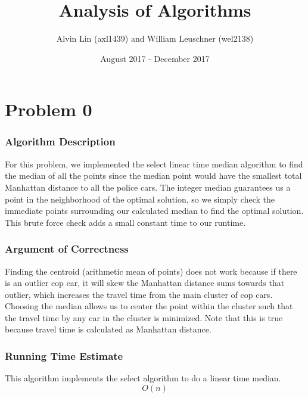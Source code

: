 \documentclass{math}
\title{Analysis of Algorithms}
\author{Alvin Lin (axl1439) and William Leuschner (wel2138)}
\date{August 2017 - December 2017}
\begin{document}
\maketitle

\section*{Problem 0}

\subsubsection*{Algorithm Description}
For this problem, we implemented the select linear time median algorithm to
find the median of all the points since the median point would have the smallest
total Manhattan distance to all the police cars. The integer median guarantees
us a point in the neighborhood of the optimal solution, so we simply check the
immediate points surrounding our calculated median to find the optimal solution.
This brute force check adds a small constant time to our runtime.

\subsubsection*{Argument of Correctness}
Finding the centroid (arithmetic mean of points) does not work because if there
is an outlier cop car, it will skew the Manhattan distance sums towards that
outlier, which increases the travel time from the main cluster of cop cars.
Choosing the median allows us to center the point within the cluster such that
the travel time by any car in the cluster is minimized. Note that this is true
because travel time is calculated as Manhattan distance.

\subsubsection*{Running Time Estimate}
This algorithm implements the select algorithm to do a linear time median.
\[ O(n) \]
\end{document}

